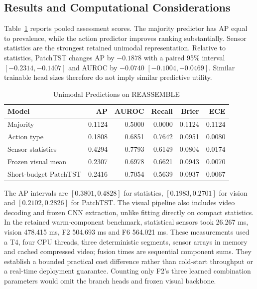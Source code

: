 \subsection{Results and Computational Considerations}
Table~\ref{tab:reassemble-unimodal} reports pooled assessment scores. The majority
predictor has AP equal to prevalence, while the action predictor improves ranking
substantially. Sensor statistics are the strongest retained unimodal representation.
Relative to statistics, PatchTST changes AP by $-0.1878$ with a paired 95\% interval
$[-0.2314, -0.1407]$ and AUROC by $-0.0740$ $[-0.1004, -0.0469]$. Similar trainable head
sizes therefore do not imply similar predictive utility.

\begin{table}[htbp]
\caption{Unimodal Predictions on REASSEMBLE}\label{tab:reassemble-unimodal}
\centering\small

\begin{tabular*}{\linewidth}{@{\extracolsep{\fill}}lrrrrr@{}}\toprule
Model & AP & AUROC & Recall & Brier & ECE\\\midrule
Majority & 0.1124 & 0.5000 & 0.0000 & 0.1124 & 0.1124\\
Action type & 0.1808 & 0.6851 & 0.7642 & 0.0951 & 0.0080\\
Sensor statistics & 0.4294 & 0.7793 & 0.6149 & 0.0804 & 0.0174\\
Frozen visual mean & 0.2307 & 0.6978 & 0.6621 & 0.0943 & 0.0070\\
Short-budget PatchTST & 0.2416 & 0.7054 & 0.5639 & 0.0937 & 0.0067\\\bottomrule
\end{tabular*}
\end{table}

The AP intervals are $[0.3801, 0.4828]$ for statistics, $[0.1983, 0.2701]$ for vision and
$[0.2102, 0.2826]$ for PatchTST. The visual pipeline also includes video decoding and
frozen CNN extraction, unlike fitting directly on compact statistics. In the retained
warm-component benchmark, statistical sensors took 26.267 ms, vision 478.415 ms, F2
504.693 ms and F6 564.021 ms. These measurements used a T4, four CPU threads, three
deterministic segments, sensor arrays in memory and cached compressed video; fusion
times are sequential component sums. They establish a bounded practical cost difference
rather than cold-start throughput or a real-time deployment guarantee. Counting only
F2's three learned combination parameters would omit the branch heads and frozen visual
backbone.

